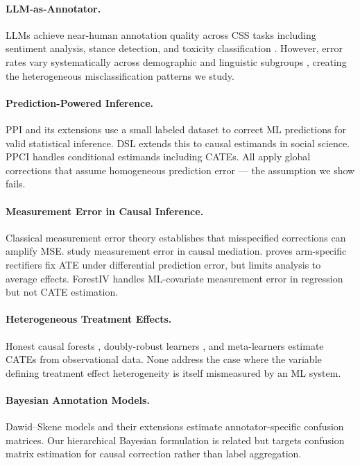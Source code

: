 \documentclass[11pt]{article}
\begin{document}
\paragraph{LLM-as-Annotator.}
LLMs achieve near-human annotation quality across CSS tasks including sentiment analysis, stance detection, and toxicity classification \cite{gilardi2023chatgpt,tornberg2024chatgpt,ziems2024can}.
However, error rates vary systematically across demographic and linguistic subgroups \cite{ashwin2025using}, creating the heterogeneous misclassification patterns we study.

\paragraph{Prediction-Powered Inference.}
PPI \cite{angelopoulos2023prediction} and its extensions \cite{angelopoulos2023ppi++} use a small labeled dataset to correct ML predictions for valid statistical inference.
DSL \cite{egami2024using} extends this to causal estimands in social science.
PPCI \cite{sui2026ppci} handles conditional estimands including CATEs.
All apply global corrections that assume homogeneous prediction error --- the assumption we show fails.

\paragraph{Measurement Error in Causal Inference.}
Classical measurement error theory \cite{fuller1987measurement,carroll2006measurement,gustafson2003measurement} establishes that misspecified corrections can amplify MSE.
\citet{imai2010causal} study measurement error in causal mediation.
\citet{mozer2026prediction} proves arm-specific rectifiers fix ATE under differential prediction error, but limits analysis to average effects.
ForestIV \cite{bu2023offline} handles ML-covariate measurement error in regression but not CATE estimation.

\paragraph{Heterogeneous Treatment Effects.}
Honest causal forests \cite{wager2018estimation,athey2019generalized}, doubly-robust learners \cite{kennedy2023towards}, and meta-learners \cite{chernozhukov2018double} estimate CATEs from observational data.
None address the case where the variable defining treatment effect heterogeneity is itself mismeasured by an ML system.

\paragraph{Bayesian Annotation Models.}
Dawid--Skene models \cite{dawid1979maximum} and their extensions \cite{passonneau2014benefits,hovy2013learning} estimate annotator-specific confusion matrices.
Our hierarchical Bayesian formulation is related but targets confusion matrix estimation for causal correction rather than label aggregation.
\end{document}
